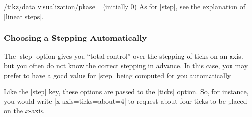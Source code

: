 \begin{key}{/tikz/data visualization/phase= (initially 0)}
  As for |step|, see the explanation of |linear steps|.
\end{key}



\subsubsection{Choosing a Stepping Automatically}

The |step| option gives you ``total control'' over the stepping of
ticks on an axis, but you often do not know the correct stepping in
advance. In this case, you may prefer to have a good value for |step|
being computed for you automatically.

Like the |step| key, these options are passed to the |ticks|
option. So, for instance, you would write |x axis={ticks={about=4}}|
to request about four ticks to be placed on the $x$-axis.


